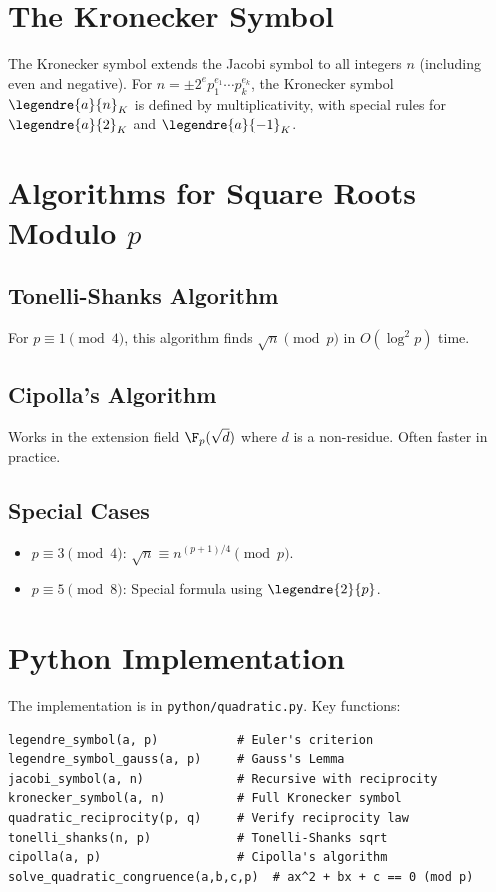\section{The Kronecker Symbol}

The Kronecker symbol extends the Jacobi symbol to all integers $n$ (including even and negative). For $n = \pm 2^e p_1^{e_1} \cdots p_k^{e_k}$, the Kronecker symbol $\legendre{a}{n}_K$ is defined by multiplicativity, with special rules for $\legendre{a}{2}_K$ and $\legendre{a}{-1}_K$.

\section{Algorithms for Square Roots Modulo $p$}

\subsection{Tonelli-Shanks Algorithm}
For $p \equiv 1 \pmod{4}$, this algorithm finds $\sqrt{n} \pmod{p}$ in $O(\log^2 p)$ time.

\subsection{Cipolla's Algorithm}
Works in the extension field $\F_p(\sqrt{d})$ where $d$ is a non-residue. Often faster in practice.

\subsection{Special Cases}
\begin{itemize}
    \item $p \equiv 3 \pmod{4}$: $\sqrt{n} \equiv n^{(p+1)/4} \pmod{p}$.
    \item $p \equiv 5 \pmod{8}$: Special formula using $\legendre{2}{p}$.
\end{itemize}

\section{Python Implementation}
\label{sec:quadratic-python}

The implementation is in \texttt{python/quadratic.py}. Key functions:

\begin{lstlisting}[style=python, caption={Key functions in python/quadratic.py}]
legendre_symbol(a, p)           # Euler's criterion
legendre_symbol_gauss(a, p)     # Gauss's Lemma
jacobi_symbol(a, n)             # Recursive with reciprocity
kronecker_symbol(a, n)          # Full Kronecker symbol
quadratic_reciprocity(p, q)     # Verify reciprocity law
tonelli_shanks(n, p)            # Tonelli-Shanks sqrt
cipolla(a, p)                   # Cipolla's algorithm
solve_quadratic_congruence(a,b,c,p)  # ax^2 + bx + c == 0 (mod p)
\end{lstlisting}

